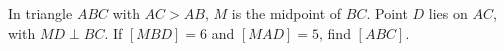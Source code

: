 In triangle $ABC$ with $AC>AB$, $M$ is the midpoint of $BC$. Point $D$ lies on $AC$, with $MD\perp BC$. If $[MBD]=6$ and $[MAD]=5$, find $[ABC]$.
